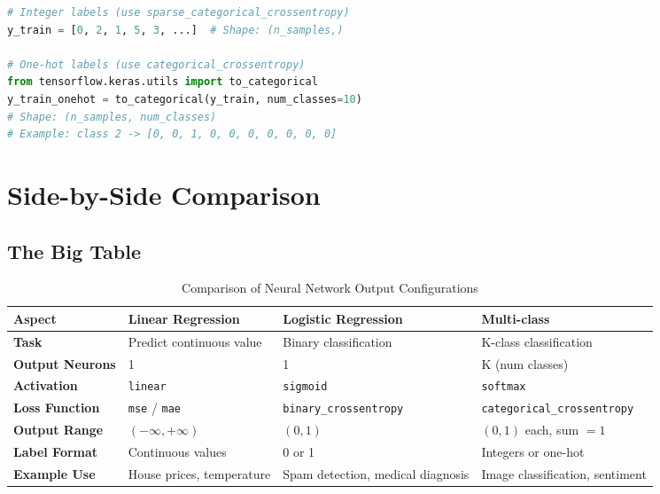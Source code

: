 \documentclass[12pt,a4paper]{article}
\begin{document}
\begin{lstlisting}[language=Python, caption=Multi-class Label Formats]
# Integer labels (use sparse_categorical_crossentropy)
y_train = [0, 2, 1, 5, 3, ...]  # Shape: (n_samples,)

# One-hot labels (use categorical_crossentropy)
from tensorflow.keras.utils import to_categorical
y_train_onehot = to_categorical(y_train, num_classes=10)
# Shape: (n_samples, num_classes)
# Example: class 2 -> [0, 0, 1, 0, 0, 0, 0, 0, 0, 0]
\end{lstlisting}

\newpage


\section{Side-by-Side Comparison}

\subsection{The Big Table}

\begin{table}[h!]
\centering
\small
\renewcommand{\arraystretch}{1.5}
\begin{tabularx}{\textwidth}{|l|Y|Y|Y|}
\hline
\textbf{Aspect} & \textbf{Linear Regression} & \textbf{Logistic Regression} & \textbf{Multi-class} \\
\hline
\textbf{Task} & Predict continuous value & Binary classification & K-class classification \\
\hline
\textbf{Output Neurons} & 1 & 1 & K (num classes) \\
\hline
\textbf{Activation} & \texttt{linear} & \texttt{sigmoid} & \texttt{softmax} \\
\hline
\textbf{Loss Function} & \texttt{mse} / \texttt{mae} & \texttt{binary\_\allowbreak crossentropy} & \texttt{categorical\_\allowbreak crossentropy} \\
\hline
\textbf{Output Range} & $(-\infty, +\infty)$ & $(0, 1)$ & $(0, 1)$ each, sum $= 1$ \\
\hline
\textbf{Label Format} & Continuous values & 0 or 1 & Integers or one-hot \\
\hline
\textbf{Example Use} & House prices, temperature & Spam detection, medical diagnosis & Image classification, sentiment \\
\hline
\end{tabularx}
\caption{Comparison of Neural Network Output Configurations}
\end{table}
\end{document}
